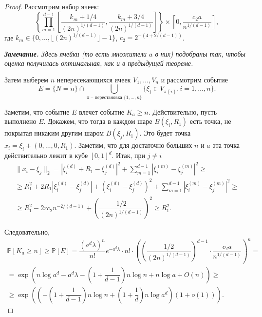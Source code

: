 \documentclass[12pt]{article}
\theoremstyle{plain}
\theoremstyle{definition}
\theoremstyle{remark}
\def\geq{\geqslant}
\newcommand{\PP}{\mathbb{P}}
\begin{document}
\begin{proof}
 Рассмотрим набор ячеек: $$\left\{\prod\limits_{m=1}^{d-1}\left[\dfrac{k_m+1/4}{(2n)^{1/(d-1)}}, \dfrac{k_m+3/4}{(2n)^{1/(d-1)}}\right]\right\} \times \left[0, \dfrac{c_2a}{n^{1/(d-1)}}\right],$$
    где $k_m \in \{0, \ldots, \lfloor (2n)^{1/(d-1)}\rfloor-1\}$, $c_2 = 2^{-(4+2/(d-1))}$. 
    
    {\it {\bf Замечание.}  Здесь ячейки (то есть множители $a$ в них) подобраны так, чтобы оценка получилась оптимальная, как и в предыдущей теореме.}
    
    Затем выберем $n$ непересекающихся ячеек $V_1, \ldots, V_n$  и рассмотрим событие $$E = \{N=n\}\cap \bigcup\limits_{\pi \text{ -- перестановка } \{1, \ldots, n\}} \{\xi_i \in V_{\pi(i)}, i = 1, \ldots, n\}.$$
    
                         
    Заметим, что событие $E$ влечет событие $K_a \geq n$. Действительно, пусть выполнено $E$. Докажем, что тогда в каждом шаре $B(\xi_i, R_1)$ есть точка, не покрытая никаким другим шаром $B(\xi_j, R_1)$. Это будет точка $x_i = \xi_i + (0, \ldots, 0, R_1)$. Заметим, что для достаточно больших $n$ и $a$ эта точка действительно лежит в кубе $[0, 1]^d$. Итак, при $j \not= i$
    \begin{multline*}
        \|x_i - \xi_j\|_2 = 
        |\xi_i^{(d)} + R_1 - \xi_j^{(d)} |^2 + \sum_{m=1}^{d-1}|\xi_i^{(m)} - \xi_j^{(m)}|^2 \geq\\
        \geq R_1^2 + 2R_1|\xi_i^{(d)} - \xi_j^{(d)}| + (\xi_i^{(d)} - \xi_j^{(d)})^2  + \sum_{m=1}^{d-1}|\xi_i^{(m)} - \xi_j^{(m)}|^2 \geq \\
        \geq R_1^2 - 2rc_2n^{-2/(d-1)} + \left(\dfrac{1/2}{(2n)^{1/(d-1)}}\right)^2 \geq R_1^2.
    \end{multline*}{}
    
    
    Следовательно, 
    \begin{multline*}
        \PP[K_a\geq n] \geq \PP[E] = \dfrac{(a^d\lambda)^n}{n!}e^{-a^d\lambda}\cdot n!\cdot \left(\left(\dfrac{1/2}{(2n)^{1/(d-1)}}\right)^{d-1}\cdot \dfrac{c_2a}{n^{1/(d-1)}}\right)^n = \\
        =\exp\left(n\log a^d - a^d\lambda - \left(1+\dfrac{1}{d-1}\right)n\log n + n\log a +  O(n)\right) \geq \\
        \geq
        \exp \left(\left(-\left(1+\dfrac{1}{d-1}\right)n\log n + \left(1+\dfrac{1}{d}\right)n\log a^d\right) (1+o(1))\right).
    \end{multline*}{}
    
\end{proof}{}
\end{document}

